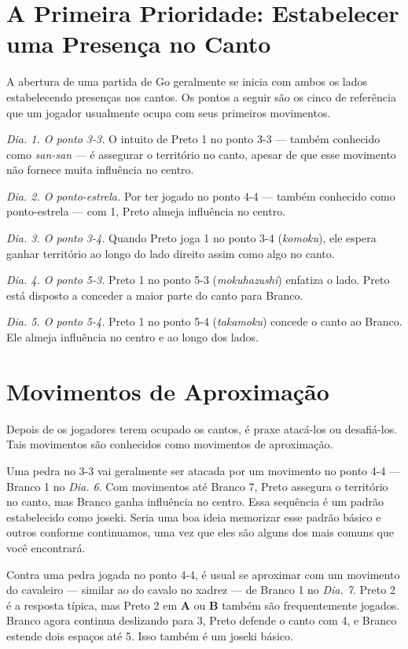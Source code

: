 \section{A Primeira Prioridade: Estabelecer uma Presença no Canto}

A abertura de uma partida de Go geralmente se inicia com ambos os lados estabelecendo presenças nos cantos. Os pontos a seguir são os cinco de referência que um jogador usualmente ocupa com seus primeiros movimentos.

\emph{Dia. 1. O ponto 3-3.} O intuito de Preto 1 no ponto 3-3 --- também conhecido como \emph{san-san} --- é assegurar o território no canto, apesar de que esse movimento não fornece muita influência no centro.

\emph{Dia. 2. O ponto-estrela.} Por ter jogado no ponto 4-4 --- também conhecido como ponto-estrela --- com 1, Preto almeja influência no centro.

\emph{Dia. 3. O ponto 3-4.} Quando Preto joga 1 no ponto 3-4 (\emph{komoku}), ele espera ganhar território ao longo do lado direito assim como algo no canto.

\emph{Dia. 4. O ponto 5-3.} Preto 1 no ponto 5-3 (\emph{mokuhazushi}) enfatiza o lado. Preto está disposto a conceder a maior parte do canto para Branco.

\emph{Dia. 5. O ponto 5-4.} Preto 1 no ponto 5-4 (\emph{takamoku}) concede o canto ao Branco. Ele almeja influência no centro e ao longo dos lados.

\section{Movimentos de Aproximação}

Depois de os jogadores terem ocupado os cantos, é praxe atacá-los ou desafiá-los. Tais movimentos são conhecidos como movimentos de aproximação.

Uma pedra no 3-3 vai geralmente ser atacada por um movimento no ponto 4-4 --- Branco 1 no \emph{Dia. 6}. Com movimentos até Branco 7, Preto assegura o território no canto, mas Branco ganha influência no centro. Essa sequência é um padrão estabelecido como joseki. Seria uma boa ideia memorizar esse padrão básico e outros conforme continuamos, uma vez que eles são alguns dos mais comuns que você encontrará.

Contra uma pedra jogada no ponto 4-4, é usual se aproximar com um movimento do cavaleiro --- similar ao do cavalo no xadrez --- de Branco 1 no \emph{Dia. 7}. Preto 2 é a resposta típica, mas Preto 2 em \textbf{A} ou \textbf{B} também são frequentemente jogados. Branco agora continua deslizando para 3, Preto defende o canto com 4, e Branco estende dois espaços até 5. Isso também é um joseki básico.


